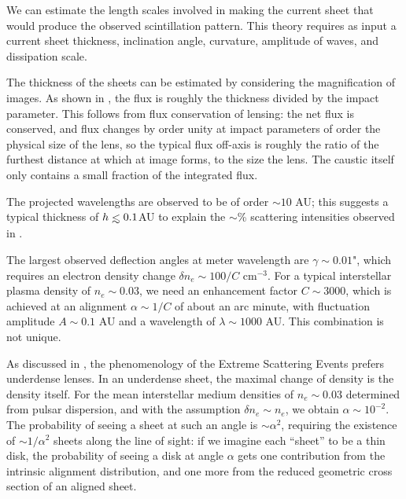 \documentclass[useAMS,usenatbib]{mn2e}
\def\lesssim{\mathrel{\hbox{\rlap{\hbox{\lower4pt\hbox{$\sim$}}}\hbox{$<$}}}}
\begin{document}
We can estimate the length scales involved in making the current sheet that
would produce the observed scintillation pattern.  This theory requires as
input a current sheet thickness, inclination angle, curvature,
amplitude of waves, and dissipation scale.

The thickness of the sheets can be estimated by considering the magnification of
images.  As shown in \cite{2012MNRAS.421L.132P}, the flux is roughly
the thickness divided by the impact parameter.  This follows from flux
conservation of lensing: the net flux is conserved, and flux changes
by order unity at impact parameters of order the physical size of the
lens, so the typical flux off-axis is roughly the ratio of the
furthest distance at which at image forms, to the size the lens.  The
caustic itself only contains a small fraction of the integrated flux.


The projected wavelengths
are observed to be of order $\sim 10$ AU;
this suggests a typical thickness of $h\lesssim 0.1$AU to explain the
$\sim$\%  scattering intensities observed in \cite{2010ApJ...708..232B}.


The largest observed deflection angles at meter wavelength are $\gamma
\sim 0.01$", which requires an electron density change $\delta n_e\sim
100/C$ cm$^{-3}$.  For a typical interstellar plasma density of $n_e
\sim 0.03$, we need an enhancement factor $C\sim 3000$, which is
achieved at an alignment $\alpha \sim 1/C$ of about an arc minute,
with fluctuation amplitude $A\sim 0.1$ AU and a wavelength of $\lambda
\sim 1000$ AU.  This combination is not unique.


As discussed in \cite{2012MNRAS.421L.132P}, the  phenomenology of the
Extreme Scattering Events
prefers underdense lenses.  In an underdense sheet, the maximal change
of density is the density itself.  
For the mean interstellar medium
densities of $n_e\sim 0.03$ determined from pulsar dispersion, and with the assumption
$\delta n_e\sim n_e$, we obtain $\alpha \sim
10^{-2}$.  The probability of seeing a sheet at such an angle is $\sim
\alpha^2$, requiring the existence of $\sim 1/\alpha^2$ sheets along
the line of sight: if we imagine each ``sheet'' to be a thin disk, the
probability of seeing a disk at angle $\alpha$ gets one contribution
from the intrinsic alignment distribution, and one more from the
reduced geometric cross section of an aligned sheet.
\end{document}
